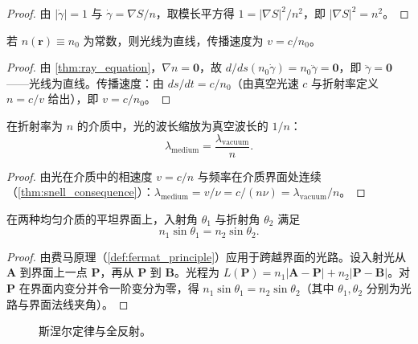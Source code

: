 \begin{proof}
由 $|\dot\gamma|=1$ 与 $\dot\gamma = \nabla S/n$，取模长平方得 $1 = |\nabla S|^2/n^2$，即 $|\nabla S|^2 = n^2$。
\end{proof}

\begin{corollary}[均匀介质中的直线传播]\label{cor:straight_line_uniform}
若 $n(\mathbf{r})\equiv n_0$ 为常数，则光线为直线，传播速度为 $v = c/n_0$。
\end{corollary}

\begin{proof}
由 \cref{thm:ray_equation}，$\nabla n = \mathbf{0}$，故 $d/ds(n_0\dot\gamma) = n_0\ddot\gamma = \mathbf{0}$，即 $\ddot\gamma = \mathbf{0}$——光线为直线。传播速度：由 $ds/dt = c/n_0$（由真空光速 $c$ 与折射率定义 $n = c/v$ 给出），即 $v = c/n_0$。
\end{proof}

\begin{proposition}[介质中的波长缩放]\label{prop:medium_wavelength_scaling}
在折射率为 $n$ 的介质中，光的波长缩放为真空波长的 $1/n$：
\[
\lambda_{\text{medium}} = \frac{\lambda_{\text{vacuum}}}{n}.
\]
\end{proposition}

\begin{proof}
由光在介质中的相速度 $v = c/n$ 与频率在介质界面处连续（\cref{thm:snell_consequence}）：$\lambda_{\text{medium}} = v/\nu = c/(n\nu) = \lambda_{\text{vacuum}}/n$。
\end{proof}

\begin{theorem}[斯涅尔定律]\label{thm:snell_consequence}
在两种均匀介质的平坦界面上，入射角 $\theta_1$ 与折射角 $\theta_2$ 满足
\[
n_1\sin\theta_1 = n_2\sin\theta_2.
\]
\end{theorem}

\begin{proof}
由费马原理（\cref{def:fermat_principle}）应用于跨越界面的光路。设入射光从 $\mathbf{A}$ 到界面上一点 $\mathbf{P}$，再从 $\mathbf{P}$ 到 $\mathbf{B}$。光程为 $L(\mathbf{P}) = n_1|\mathbf{A}-\mathbf{P}| + n_2|\mathbf{P}-\mathbf{B}|$。对 $\mathbf{P}$ 在界面内变分并令一阶变分为零，得 $n_1\sin\theta_1 = n_2\sin\theta_2$（其中 $\theta_1,\theta_2$ 分别为光路与界面法线夹角）。
\end{proof}

\begin{figure}[htbp]
\centering
{}
\caption{斯涅尔定律与全反射。}
\label{fig:snell}
\end{figure}

